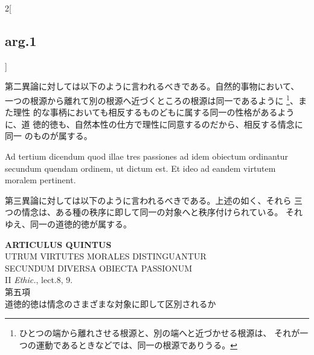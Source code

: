 \documentclass[paper=a4paper,fontsize=10pt,jafontsize=9pt,titlepage]{jlreq}
\begin{document}
\begin{paracol}{2}[\subsection{arg.1}]
\switchcolumn

第二異論に対しては以下のように言われるべきである。自然的事物において、
 一つの根源から離れて別の根源へ近づくところの根源は同一であるように
 \footnote{ひとつの端から離れさせる根源と、別の端へと近づかせる根源は、
 それが一つの運動であるときなどでは、同一の根源でありうる。}、また理性
 的な事柄においても相反するものどもに属する同一の性格があるように、道
 徳的徳も、自然本性の仕方で理性に同意するのだから、相反する情念に同一
 のものが属する。

\switchcolumn*[\subsection{ad.3}]

Ad tertium dicendum quod illae tres passiones ad idem obiectum
 ordinantur secundum quendam ordinem, ut dictum est. Et ideo ad eandem
 virtutem moralem pertinent.

\switchcolumn

第三異論に対しては以下のように言われるべきである。上述の如く、それら
 三つの情念は、ある種の秩序に即して同一の対象へと秩序付けられている。
 それゆえ、同一の道徳的徳が属する。

\end{paracol}
\newpage
{}
{}
\setcounter{section}{5}
\setcounter{subsection}{0}





\begin{center}
{\Large {\bfseries ARTICULUS QUINTUS}}\\
{\large UTRUM VIRTUTES MORALES DISTINGUANTUR\\SECUNDUM DIVERSA OBIECTA PASSIONUM}\\
{\footnotesize II {\itshape Ethic.}, lect.8, 9.}\\
{\Large 第五項\\道徳的徳は情念のさまざまな対象に即して区別されるか}
\end{center}
\end{document}
